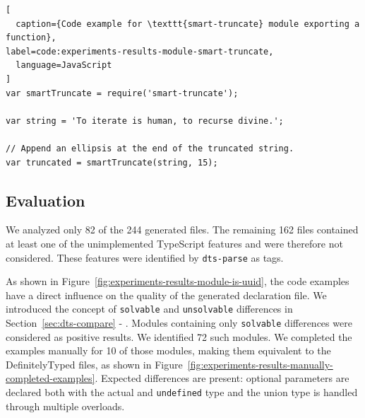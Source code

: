 \documentclass[a4paper,english,cleveref, autoref]{lipics-v2019}
\newcommand{\secref}[1]{Section~\ref{#1} - \nameref{#1}}
\newcommand{\figref}[1]{Figure~\ref{#1}}
\begin{document}
\begin{lstlisting}[
  caption={Code example for \texttt{smart-truncate} module exporting a function},
label=code:experiments-results-module-smart-truncate,
  language=JavaScript
]
var smartTruncate = require('smart-truncate');

var string = 'To iterate is human, to recurse divine.';

// Append an ellipsis at the end of the truncated string.
var truncated = smartTruncate(string, 15);
\end{lstlisting}

\subsection{Evaluation}
\label{sec:experiments-evaluation}
We analyzed only 82 of the 244 generated files. The remaining 162 files contained at least one of the unimplemented TypeScript features and were therefore not considered. These features were identified by \texttt{dts-parse} as tags.

As shown in \figref{fig:experiments-results-module-is-uuid}, the code examples have a direct influence on the quality of the generated declaration file. We introduced the concept of \texttt{solvable} and \texttt{unsolvable} differences in \secref{sec:dts-compare}. Modules containing only \texttt{solvable} differences were considered as positive results. We identified 72 such modules. We completed the examples manually for 10 of those modules, making them equivalent to the DefinitelyTyped files, as shown in \figref{fig:experiments-results-manually-completed-examples}. Expected differences are present: optional parameters are declared both with the actual and \texttt{undefined} type and the union type is handled through multiple overloads.
\end{document}
